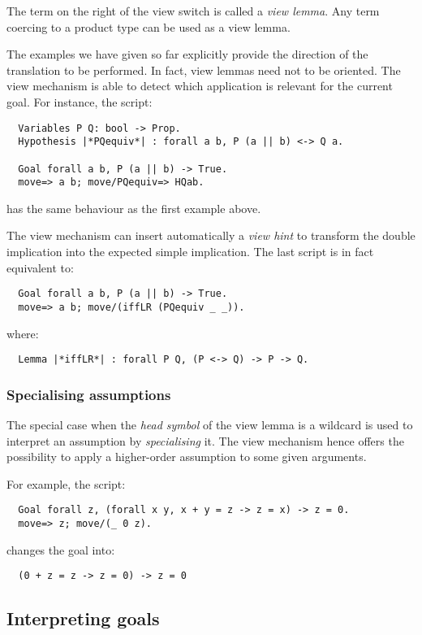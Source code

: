 The term on the right of the \C{/} view switch is called a \emph{view
  lemma}. Any \ssr{} term coercing to a product type can be used as a
view lemma.


The examples we have given so far explicitly provide the direction of the
translation to be performed. In fact, view lemmas need not to be
oriented. The view mechanism is able to detect which
application is relevant for the current goal. For instance, the
script:
\begin{lstlisting}
  Variables P Q: bool -> Prop.
  Hypothesis |*PQequiv*| : forall a b, P (a || b) <-> Q a.

  Goal forall a b, P (a || b) -> True.
  move=> a b; move/PQequiv=> HQab.
\end{lstlisting}
has the same behaviour as the first example above.

The view mechanism can insert automatically a \emph{view hint} to
transform the double implication into the expected simple implication.
The last script is in fact equivalent to:
\begin{lstlisting}
  Goal forall a b, P (a || b) -> True.
  move=> a b; move/(iffLR (PQequiv _ _)).
\end{lstlisting}
where:
\begin{lstlisting}
  Lemma |*iffLR*| : forall P Q, (P <-> Q) -> P -> Q.
\end{lstlisting}


\subsubsection*{Specialising assumptions}
The special case when the \emph{head symbol} of the view lemma is a
wildcard is used to interpret an assumption by \emph{specialising}
it. The view mechanism hence offers the possibility to
apply a higher-order assumption to some given arguments.

For example, the script:
\begin{lstlisting}
  Goal forall z, (forall x y, x + y = z -> z = x) -> z = 0.
  move=> z; move/(_ 0 z).
\end{lstlisting}
changes the goal into:
\begin{lstlisting}
  (0 + z = z -> z = 0) -> z = 0
\end{lstlisting}




\subsection{Interpreting goals}\label{ssec:goalinterp}

